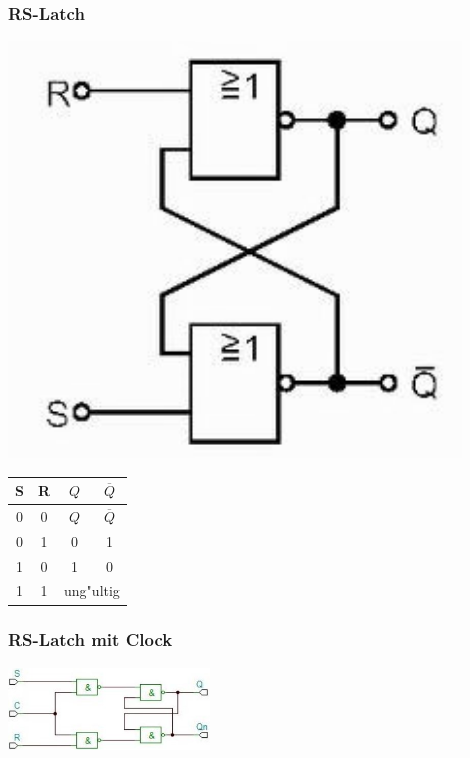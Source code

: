 	\begin{multicols}{2}
		\subsubsection{RS-Latch}
			\begin{minipage}{4 cm}
				\includegraphics[width=0.9\textwidth]{pics/rs_latch}
			\end{minipage}
			\begin{minipage}{4 cm}
				\begin{tabular}{|cc|cc|}
					\hline
						S & R & $Q$ & $\overline{Q}$ \\
					\hline	
						0 & 0 & $Q$ & $\overline{Q}$ \\
						0 & 1 & 0 & 1 \\
						1 & 0 & 1 & 0 \\
						1 & 1 & \multicolumn{2}{c|}{ung"ultig} \\
					\hline
				\end{tabular}
			\end{minipage}
		
		\subsubsection{RS-Latch mit Clock}
			\includegraphics[width=0.4\textwidth]{pics/rs_latch_clock}
		\columnbreak
		

\end{multicols}
